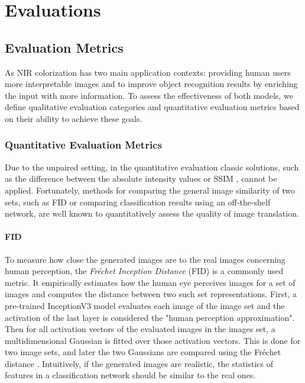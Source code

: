 \chapter{Evaluations}

\section{Evaluation Metrics}

As NIR colorization has two main application contexts: providing human users more interpretable images and to improve object recognition results by enriching the input with more information.
To assess the effectiveness of both models, we define qualitative evaluation categories and quantitative evaluation metrics based on their ability to achieve these goals.

\subsection{Quantitative Evaluation Metrics}
Due to the unpaired setting, in the quantitative evaluation classic solutions, such as the difference between the absolute intensity values or SSIM \cite{ssim}, cannot be applied. Fortunately, methods for comparing the general image similarity of two sets, such as FID \cite{ttur} or
comparing classification results using an off-the-shelf network, are well known to quantitatively assess the quality of image translation.

\subsubsection*{FID}
To measure how close the generated images are to the real images concerning human perception, the \textit{Fréchet Inception Distance} (FID) \cite{ttur} is a commonly used metric.
It empirically estimates how the human eye perceives images for a set of images and computes the distance between two such set representations.
First, a pre-trained InceptionV3 model evaluates each image of the image set and the activation of the last layer is considered the "human perception approximation".
Then for all activation vectors of the evaluated images in the images set, a multidimensional Gaussian is fitted over those activation vectors.
This is done for two image sets, and later the two Gaussians are compared using the Fréchet distance \cite{ttur}.
Intuitively, if the generated images are realistic, the statistics of features in a classification network should be similar to the real ones.

